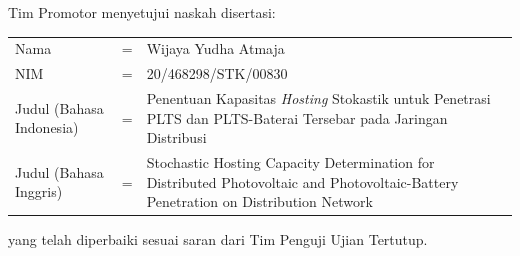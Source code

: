 \vspace*{8pt}
\BgThispage
\noindent Tim Promotor menyetujui naskah disertasi:
\vspace*{-8pt}
{
\begin{longtable}{llp{264pt}}
	\hspace*{-11pt}Nama						& = & Wijaya Yudha Atmaja\\
	\hspace*{-11pt}NIM						& = & 20/468298/STK/00830\\
	\hspace*{-11pt}Judul (Bahasa Indonesia)	& = & Penentuan Kapasitas \textit{Hosting} Stokastik untuk Penetrasi PLTS dan PLTS-Baterai Tersebar pada Jaringan Distribusi\\
	\hspace*{-11pt}Judul	(Bahasa Inggris) 	& = & Stochastic Hosting Capacity Determination for Distributed Photovoltaic and Photovoltaic-Battery Penetration on Distribution Network
\end{longtable}
}
\vspace*{-22pt}
\noindent yang telah diperbaiki sesuai saran dari Tim Penguji Ujian Tertutup.
\vspace*{4cm}

